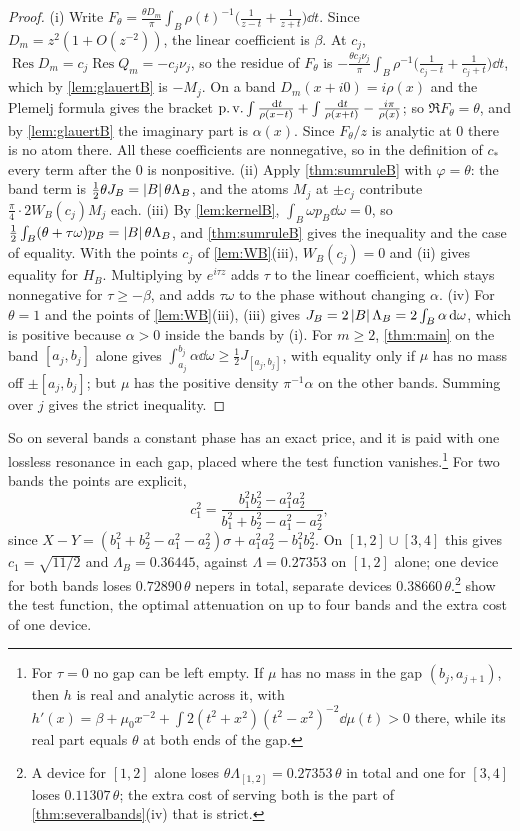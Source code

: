 \begin{proof}
(i) Write $F_\theta=\frac{\theta D_m}\pi\int_B\rho(t)^{-1}
\big(\frac1{z-t}+\frac1{z+t}\big)\dd t$. Since $D_m=z^2(1+O(z^{-2}))$, the
linear coefficient is $\beta$. At $c_j$, $\operatorname{Res}D_m=c_j
\operatorname{Res}Q_m=-c_j\nu_j$, so the residue of $F_\theta$ is
$-\frac{\theta c_j\nu_j}\pi\int_B\rho^{-1}\big(\frac1{c_j-t}+\frac1{c_j+t}\big)\dd t$,
which by \cref{lem:glauertB} is $-M_j$. On a band $D_m(x+i0)=i\rho(x)$ and
the Plemelj formula gives the bracket
$\operatorname{p.v.}\int\frac{\,\mathrm d t}{\rho(x-t)}+\int\frac{\,\mathrm d t}{\rho(x+t)}-\frac{i\pi}{\rho(x)}$;
so $\Re F_\theta=\theta$, and by \cref{lem:glauertB} the imaginary part is
$\alpha(x)$. Since $F_\theta/z$ is analytic at $0$ there is no atom there.
All these coefficients are nonnegative, so in the definition of $c_*$ every
term after the $0$ is nonpositive.
(ii) Apply \cref{thm:sumruleB} with $\varphi=\theta$: the band term is
$\frac12\theta J_B=\left|B\right|\theta\Lambda_B$, and the atoms $M_j$ at $\pm c_j$
contribute $\frac\pi4\cdot2W_B(c_j)M_j$ each.
(iii) By \cref{lem:kernelB}, $\int_B\omega p_B\dd\omega=0$, so
$\frac12\int_B(\theta+\tau\omega)p_B=\left|B\right|\theta\Lambda_B$, and
\cref{thm:sumruleB} gives the inequality and the case of equality. With the
points $c_j$ of \cref{lem:WB}(iii), $W_B(c_j)=0$ and (ii) gives equality for
$H_B$. Multiplying by $e^{i\tau z}$ adds $\tau$ to the linear coefficient,
which stays nonnegative for $\tau\ge-\beta$, and adds $\tau\omega$ to the
phase without changing $\alpha$.
(iv) For $\theta=1$ and the points of \cref{lem:WB}(iii), (iii) gives
$J_B=2\left|B\right|\Lambda_B=2\int_B\alpha\,\mathrm d\omega$, which is positive because
$\alpha>0$ inside the bands by (i). For $m\ge2$, \cref{thm:main} on the band
$[a_j,b_j]$ alone gives $\int_{a_j}^{b_j}\alpha\dd\omega\ge\frac12J_{[a_j,b_j]}$,
with equality only if $\mu$ has no mass off $\pm[a_j,b_j]$; but $\mu$ has the
positive density $\pi^{-1}\alpha$ on the other bands. Summing over $j$ gives the
strict inequality.
\end{proof}

So on several bands a constant phase has an exact price, and it is paid
with one lossless resonance in each gap, placed where the test function
vanishes.\footnote{For $\tau=0$ no gap can be left empty. If $\mu$ has no mass in
the gap $(b_j,a_{j+1})$, then $h$ is real and analytic across it, with
$h'(x)=\beta+\mu_0x^{-2}+\int2(t^2+x^2)(t^2-x^2)^{-2}\dd\mu(t)>0$ there,
while its real part equals $\theta$ at both ends of the gap.} For two
bands the points are explicit,
\[
c_1^2=\frac{b_1^2b_2^2-a_1^2a_2^2}{b_1^2+b_2^2-a_1^2-a_2^2},
\]
since $X-Y=(b_1^2+b_2^2-a_1^2-a_2^2)\sigma+a_1^2a_2^2-b_1^2b_2^2$. On
$[1,2]\cup[3,4]$ this gives $c_1=\sqrt{11/2}$ and $\Lambda_B=0.36445$, against
$\Lambda=0.27353$ on $[1,2]$ alone; one device for both bands loses
$0.72890\,\theta$ nepers in total, separate devices
$0.38660\,\theta$.\footnote{A device for $[1,2]$ alone loses
$\theta\Lambda_{[1,2]}=0.27353\,\theta$ in total and one for $[3,4]$
loses $0.11307\,\theta$; the extra cost of serving both is the part of
\cref{thm:severalbands}(iv) that is strict.} 
show the test function, the optimal attenuation on up to four bands and the
extra cost of one device.


